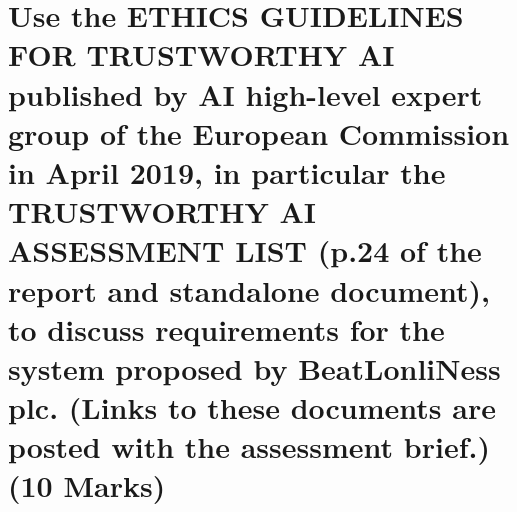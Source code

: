 \documentclass[a4paper,10pt]{article}
\begin{document}
\cite{bruce2020practical}
\cite{geron2019hands}
\cite{grus2019data}
\cite{towards_ds_t}
\cite{cloudfactory}

	
\section{Use the ETHICS GUIDELINES FOR TRUSTWORTHY AI published by AI high-level expert group of the European Commission in April 2019, in particular the TRUSTWORTHY AI ASSESSMENT LIST (p.24 of the report and standalone document), to discuss requirements for the system proposed by BeatLonliNess plc. (Links to these documents are posted with the assessment brief.) (10 Marks)}

	
\medskip
\newpage
	
	

\newpage



\end{document}
